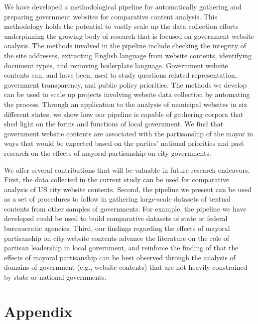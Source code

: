 \documentclass[11pt]{article}
\begin{document}
We have developed a methodological pipeline for automatically gathering and preparing government websites for comparative content analysis. This methodology holds the potential to vastly scale up the data collection efforts underpinning the growing body of research that is focused on government website analysis. The methods involved in the pipeline include checking the integrity of the site addresses, extracting English language from website contents, identifying document types, and removing boilerplate language. Government website contents can, and have been, used to study questions related representation, government transparency, and public policy priorities. The methods we develop can be used to scale up projects involving website data collection by automating the process. Through an application to the analysis of municipal websites in six different states, we show how our pipeline is capable of gathering corpora that shed light on the forms and functions of local government. We find that government website contents are associated with the partisanship of the mayor in ways that would be expected based on the parties' national priorities and past research on the effects of mayoral partisanship on city governments.

We offer several contributions that will be valuable in future research endeavors. First, the data collected in the current study can be used for comparative analysis of US city website contents. Second, the pipeline we present can be used as a set of procedures to follow in gathering large-scale datasets of textual contents from other samples of governments. For example, the pipeline we have developed could be used to build comparative datasets of state or federal bureaucratic agencies. Third, our findings regarding the effects of mayoral partisanship on city website contents advance the literature on the role of partisan leadership in local government, and reinforce the finding of \citet{gerber2011mayors} that the effects of mayoral partisanship can be best observed through the analysis of domains of government (e.g., website contents) that are not heavily constrained by state or national governments.


%
%

\newpage

%


\newpage
\section*{Appendix}
\end{document}
